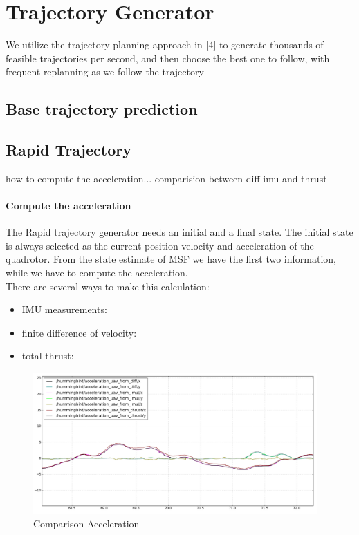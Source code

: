 \chapter{Trajectory Generator}\label{chap:trajectory_generator}
We utilize the trajectory planning
approach in [4] to generate thousands of feasible
trajectories per second, and then choose the best one to
follow, with frequent replanning as we follow the trajectory

\section{Base trajectory prediction}

\section{Rapid Trajectory}
how to compute the acceleration...
comparision between diff imu and thrust
\subsubsection{Compute the acceleration}
The Rapid trajectory generator needs an initial and a final state. The initial state is always selected as the current position velocity and acceleration of the quadrotor. From the state estimate of MSF we have the first two information, while we have to compute the acceleration.\\
There are several ways to make this calculation:
\begin{itemize}
\item IMU measurements:
\item finite difference of velocity:
\item total thrust:
\end{itemize}

\begin{figure}[!ht]
    \centering
    \includegraphics[width=0.97\textwidth]{img/comparison_acc.png}
    \caption{Comparison Acceleration}
    \label{fig:comparison_acc}
\end{figure}

